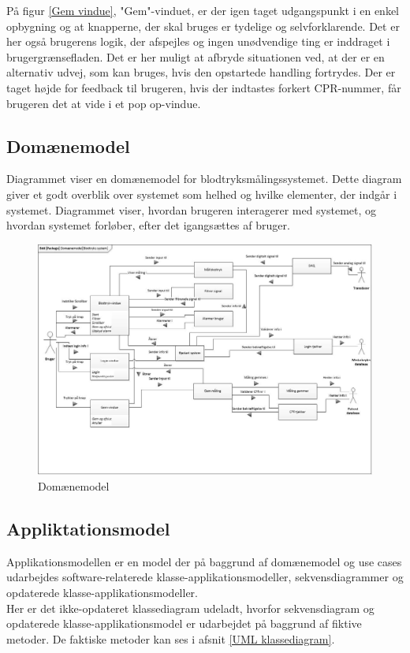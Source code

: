 På figur \ref{Gem vindue}, "Gem"\--vinduet, er der igen taget udgangspunkt i en enkel opbygning og at knapperne, der skal bruges er tydelige og selvforklarende. Det er her også brugerens logik, der afspejles og ingen unødvendige ting er inddraget i brugergrænsefladen. Det er her muligt at afbryde situationen ved, at der er en alternativ udvej, som kan bruges, hvis den opstartede handling fortrydes. Der er taget højde for feedback til brugeren, hvis der indtastes forkert CPR-nummer, får brugeren det at vide i et pop op-vindue. 

\subsection{Domænemodel}
Diagrammet viser en domænemodel for blodtryksmålingssystemet. Dette diagram giver et godt overblik over systemet som helhed og hvilke elementer, der indgår i systemet. Diagrammet viser, hvordan brugeren interagerer med systemet, og hvordan systemet forløber, efter det igangsættes af bruger. 

\begin{figure}[H]
	\centering
	\includegraphics[width=1\textwidth]{Figurer/ISE/Domaenemodel}
	\caption{Domænemodel}
	\label{domaenemodel}
\end{figure}

\subsection{Appliktationsmodel}
Applikationsmodellen er en model der på baggrund af domænemodel og use cases udarbejdes software-relaterede klasse-applikationsmodeller, sekvensdiagrammer og opdaterede klasse-applikationsmodeller.\\
Her er det ikke-opdateret klassediagram udeladt, hvorfor sekvensdiagram og opdaterede klasse-applikationsmodel er udarbejdet på baggrund af fiktive metoder. De faktiske metoder kan ses i afsnit \ref{UML klassediagram}.

